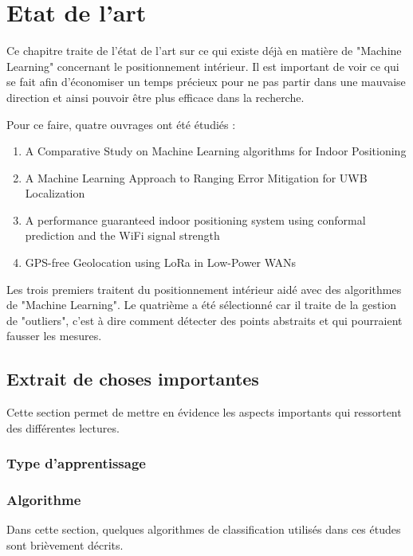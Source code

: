 \chapter{Etat de l'art}
Ce chapitre traite de l'état de l'art sur ce qui existe déjà en matière de "Machine Learning" concernant le positionnement intérieur. Il est important de voir ce qui se fait afin d'économiser un temps précieux pour ne pas partir dans une mauvaise direction et ainsi pouvoir être plus efficace dans la recherche. 

Pour ce faire, quatre ouvrages ont été étudiés :

\begin{enumerate}
	\item A Comparative Study on Machine Learning algorithms for Indoor Positioning \cite{ML_algo}
	\item A Machine Learning Approach to Ranging Error Mitigation for UWB Localization \cite{ML_UWB}
	\item A performance guaranteed indoor positioning system using conformal prediction and the WiFi signal strength \cite{CP_RSS}
	\item GPS-free Geolocation using LoRa in Low-Power WANs \cite{ML_indoor}
\end{enumerate}

Les trois premiers traitent du positionnement intérieur aidé avec des algorithmes de "Machine Learning". Le quatrième a été sélectionné car il traite de la gestion de "outliers", c'est à dire comment détecter des points abstraits et qui pourraient fausser les mesures. 

\section{Extrait de choses importantes}
Cette section permet de mettre en évidence les aspects importants qui ressortent des différentes lectures. 

\subsection{Type d'apprentissage}

\subsection{Algorithme}
Dans cette section, quelques algorithmes de classification utilisés dans ces études \cite{ML_indoor} \cite{ML_UWB} \cite{CP_RSS} sont brièvement décrits.

